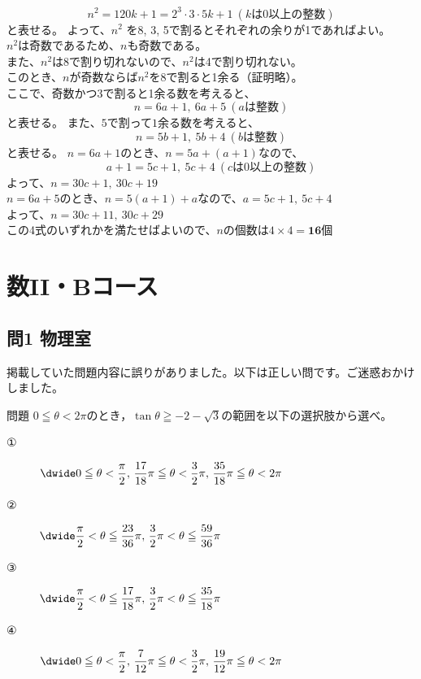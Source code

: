 \documentclass[a5paper]{ltjsarticle}
\begin{document}
\[n^2 = 120k+1 = 2^3\cdot 3\cdot 5k +1\:(\text{$k$は0以上の整数})\]
と表せる。
よって、$n^2$ を8, 3, 5で割るとそれぞれの余りが1であればよい。\\
$n^2$は奇数であるため、$n$も奇数である。\\
また、$n^2$は8で割り切れないので、$n^2$は4で割り切れない。\\
このとき、$n$が奇数ならば$n^2$を8で割ると1余る（証明略）。\\
ここで、奇数かつ3で割ると1余る数を考えると、
\[n=6a+1,\:6a+5\:(\text{$a$は整数})\]
と表せる。
また、$5$で割って$1$余る数を考えると、
\[n=5b+1,\:5b+4\:(\text{$b$は整数})\]
と表せる。
$n=6a+1$のとき、$n=5a+ (a+1)$なので、
\[a+1=5c+1,\:5c+4\:(\text{$c$は0以上の整数})\]
よって、\qquad $n=30c+1,\:30c+19$\\
$n=6a+5$のとき、$n=5(a+1)+a$なので、\qquad$a=5c+1,\:5c+4$\\
よって、\qquad$n=30c+11,\:30c+29$\\
この4式のいずれかを満たせばよいので、$n$の個数は$4\times4=\mathbf{16}$個\\


\newpage
\section{数II・Bコース}
\subsection*{問1 物理室}
掲載していた問題内容に誤りがありました。以下は正しい問です。ご迷惑おかけしました。
\begin{itembox}[l]{問題}
$\displaystyle 0\leqq \theta <2\pi$のとき，$\displaystyle \tan \theta \geqq -2-\sqrt{3}$の範囲を以下の選択肢から選べ。
\begin{description}
  \item[①] $\displaystyle\dwide 0\leqq \theta < \frac{\pi}{2},\, \frac{17}{18}\pi \leqq \theta < \frac{3}{2}\pi,\, \frac{35}{18}\pi \leqq \theta < 2\pi $
  \item[②] $\displaystyle\dwide \frac{\pi}{2} < \theta \leqq \frac{23}{36}\pi ,\, \frac{3}{2}\pi < \theta \leqq \frac{59}{36}\pi $
  \item[③] $\displaystyle\dwide \frac{\pi}{2} < \theta \leqq \frac{17}{18}\pi ,\, \frac{3}{2}\pi < \theta \leqq \frac{35}{18}\pi $ 
  \item[④] $\displaystyle\dwide 0\leqq \theta < \frac{\pi}{2},\, \frac{7}{12}\pi \leqq \theta < \frac{3}{2}\pi,\, \frac{19}{12}\pi \leqq \theta < 2\pi $ 
\end{description}
\end{itembox}
\end{document}
